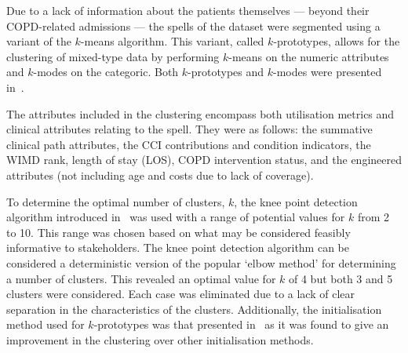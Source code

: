 \documentclass[11pt]{article}
\begin{document}
Due to a lack of information about the patients themselves --- beyond their
COPD-related admissions --- the spells of the dataset were segmented using a
variant of the \(k\)-means algorithm. This variant, called \(k\)-prototypes,
allows for the clustering of mixed-type data by performing \(k\)-means on the
numeric attributes and \(k\)-modes on the categoric. Both \(k\)-prototypes and
\(k\)-modes were presented in~\cite{Huang1998}.

The attributes included in the clustering encompass both utilisation metrics and
clinical attributes relating to the spell. They were as follows: the summative
clinical path attributes, the CCI contributions and condition indicators, the
WIMD rank, length of stay (LOS), COPD intervention status, and the engineered
attributes (not including age and costs due to lack of coverage).

To determine the optimal number of clusters, \(k\), the knee point detection
algorithm introduced in~\cite{Satopaa2011} was used with a range of potential
values for \(k\) from 2 to 10. This range was chosen based on what may be
considered feasibly informative to stakeholders. The knee point detection
algorithm can be considered a deterministic version of the popular `elbow
method' for determining a number of clusters. This revealed an optimal value for
\(k\) of 4 but both 3 and 5 clusters were considered. Each case was eliminated
due to a lack of clear separation in the characteristics of the clusters.
Additionally, the initialisation method used for \(k\)-prototypes was that
presented in~\cite{Wilde2020} as it was found to give an improvement in the
clustering over other initialisation methods.
\end{document}
